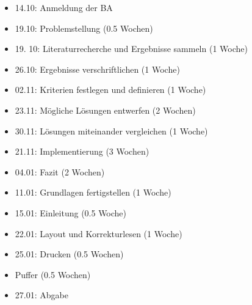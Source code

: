 \begin{itemize}
\item
  14.10: Anmeldung der BA
\item
  19.10: Problemstellung (0.5 Wochen)
    \item 19. 10: Literaturrecherche und Ergebnisse sammeln (1 Woche)
    \item 26.10: Ergebnisse verschriftlichen (1 Woche)
  \item 02.11: Kriterien festlegen und definieren (1 Woche)
\item
  23.11: Mögliche Lösungen entwerfen (2 Wochen)
\item
  30.11: Lösungen miteinander vergleichen (1 Woche)
\item
  21.11: Implementierung (3 Wochen)
\item
  04.01: Fazit (2 Wochen)
\item
  11.01: Grundlagen fertigstellen (1 Woche)
\item
  15.01: Einleitung (0.5 Woche)
\item
  22.01: Layout und Korrekturlesen (1 Woche)
\item
  25.01: Drucken (0.5 Wochen)
  \item Puffer (0.5 Wochen)
\item
  27.01: Abgabe
\end{itemize}

